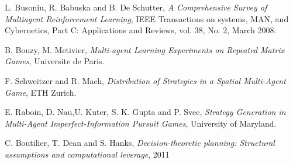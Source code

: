\documentclass[conference]{IEEEtran}
\begin{document}
\begin{thebibliography}{9}

L. Busoniu, R. Babuska and B. De Schutter, \emph{A Comprehensive Survey of Multiagent Reinforcement Learning}, IEEE Transactions on systems, MAN, and Cybernetics, Part C: Applications and Reviews, vol. 38, No. 2, March 2008.

B. Bouzy, M. Metivier, \emph{Multi-agent Learning Experiments on Repeated Matrix Games}, Universite de Paris.

F. Schweitzer and R. Mach, \emph{Distribution of Strategies in a Spatial Multi-Agent Game}, ETH Zurich.

E. Raboin, D. Nau,U. Kuter, S. K. Gupta and P. Svec, \emph{Strategy Generation in Multi-Agent Imperfect-Information
Pursuit Games}, University of Maryland.

C. Boutilier, T. Dean and S. Hanks, \emph{Decision-theoretic planning: Structural assumptions and computational leverage}, 2011

\end{thebibliography}
\end{document}
